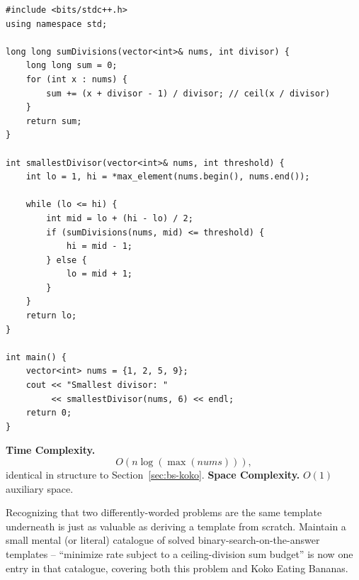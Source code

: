 \begin{lstlisting}
#include <bits/stdc++.h>
using namespace std;

long long sumDivisions(vector<int>& nums, int divisor) {
    long long sum = 0;
    for (int x : nums) {
        sum += (x + divisor - 1) / divisor; // ceil(x / divisor)
    }
    return sum;
}

int smallestDivisor(vector<int>& nums, int threshold) {
    int lo = 1, hi = *max_element(nums.begin(), nums.end());

    while (lo <= hi) {
        int mid = lo + (hi - lo) / 2;
        if (sumDivisions(nums, mid) <= threshold) {
            hi = mid - 1;
        } else {
            lo = mid + 1;
        }
    }
    return lo;
}

int main() {
    vector<int> nums = {1, 2, 5, 9};
    cout << "Smallest divisor: "
         << smallestDivisor(nums, 6) << endl;
    return 0;
}
\end{lstlisting}

\begin{complexitybox}
\textbf{Time Complexity.}
\[
  O(n \log(\max(\textit{nums}))),
\]
identical in structure to Section~\ref{sec:bs-koko}.
\textbf{Space Complexity.} $O(1)$ auxiliary space.
\end{complexitybox}

\begin{takeawaybox}
Recognizing that two differently-worded problems are the same template
underneath is just as valuable as deriving a template from scratch.
Maintain a small mental (or literal) catalogue of solved
binary-search-on-the-answer templates -- ``minimize rate subject to a
ceiling-division sum budget'' is now one entry in that catalogue, covering
both this problem and Koko Eating Bananas.
\end{takeawaybox}

